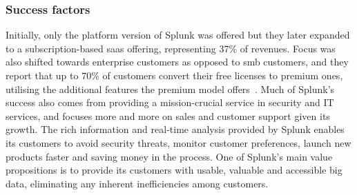 \subsubsection{Success factors}
Initially, only the platform version of Splunk was offered but they later expanded to a subscription-based \gls{saas} offering, representing 37\% of revenues. Focus was also shifted towards enterprise customers as opposed to \gls{smb} customers, and they report that up to 70\% of customers convert their free licenses to premium ones, utilising the additional features the premium model offers~\cite{philiplay2014}. Much of Splunk's success also comes from providing a mission-crucial service in security and IT services, and focuses more and more on sales and customer support given its growth. The rich information and real-time analysis provided by Splunk enables its customers to avoid security threats, monitor customer preferences, launch new products faster and saving money in the process. One of Splunk's main value propositions is to provide its customers with usable, valuable and accessible big data, eliminating any inherent inefficiencies among customers. 